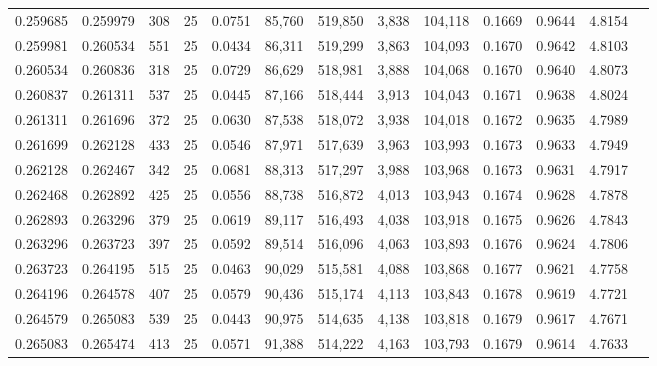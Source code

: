 \begin{tabular}{rrrrrrrrrrrrr}
0.259685 & 0.259979 &   308 &  25 &                                     0.0751 &  85,760 & 519,850 &   3,838 & 104,118 & 0.1669 & 0.9644 & 4.8154 \\
0.259981 & 0.260534 &   551 &  25 &                                     0.0434 &  86,311 & 519,299 &   3,863 & 104,093 & 0.1670 & 0.9642 & 4.8103 \\
0.260534 & 0.260836 &   318 &  25 &                                     0.0729 &  86,629 & 518,981 &   3,888 & 104,068 & 0.1670 & 0.9640 & 4.8073 \\
0.260837 & 0.261311 &   537 &  25 &                                     0.0445 &  87,166 & 518,444 &   3,913 & 104,043 & 0.1671 & 0.9638 & 4.8024 \\
0.261311 & 0.261696 &   372 &  25 &                                     0.0630 &  87,538 & 518,072 &   3,938 & 104,018 & 0.1672 & 0.9635 & 4.7989 \\
0.261699 & 0.262128 &   433 &  25 &                                     0.0546 &  87,971 & 517,639 &   3,963 & 103,993 & 0.1673 & 0.9633 & 4.7949 \\
0.262128 & 0.262467 &   342 &  25 &                                     0.0681 &  88,313 & 517,297 &   3,988 & 103,968 & 0.1673 & 0.9631 & 4.7917 \\
0.262468 & 0.262892 &   425 &  25 &                                     0.0556 &  88,738 & 516,872 &   4,013 & 103,943 & 0.1674 & 0.9628 & 4.7878 \\
0.262893 & 0.263296 &   379 &  25 &                                     0.0619 &  89,117 & 516,493 &   4,038 & 103,918 & 0.1675 & 0.9626 & 4.7843 \\
0.263296 & 0.263723 &   397 &  25 &                                     0.0592 &  89,514 & 516,096 &   4,063 & 103,893 & 0.1676 & 0.9624 & 4.7806 \\
0.263723 & 0.264195 &   515 &  25 &                                     0.0463 &  90,029 & 515,581 &   4,088 & 103,868 & 0.1677 & 0.9621 & 4.7758 \\
0.264196 & 0.264578 &   407 &  25 &                                     0.0579 &  90,436 & 515,174 &   4,113 & 103,843 & 0.1678 & 0.9619 & 4.7721 \\
0.264579 & 0.265083 &   539 &  25 &                                     0.0443 &  90,975 & 514,635 &   4,138 & 103,818 & 0.1679 & 0.9617 & 4.7671 \\
0.265083 & 0.265474 &   413 &  25 &                                     0.0571 &  91,388 & 514,222 &   4,163 & 103,793 & 0.1679 & 0.9614 & 4.7633 \\

\end{tabular}
